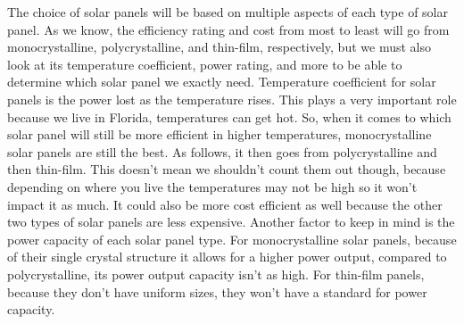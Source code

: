 The choice of solar panels will be based on multiple aspects of each type of solar panel. As we know, the efficiency rating and cost from most to least will go from monocrystalline, polycrystalline, and thin-film, respectively, but we must also look at its temperature coefficient, power rating, and more to be able to determine which solar panel we exactly need. Temperature coefficient for solar panels is the power lost as the temperature rises. This plays a very important role because we live in Florida, temperatures can get hot. So, when it comes to which solar panel will still be more efficient in higher temperatures, monocrystalline solar panels are still the best. As follows, it then goes from polycrystalline and then thin-film. This doesn’t mean we shouldn’t count them out though, because depending on where you live the temperatures may not be high so it won’t impact it as much. It could also be more cost efficient as well because the other two types of solar panels are less expensive. Another factor to keep in mind is the power capacity of each solar panel type. For monocrystalline solar panels, because of their single crystal structure it allows for a higher power output, compared to polycrystalline, its power output capacity isn’t as high. For thin-film panels, because they don’t have uniform sizes, they won’t have a standard for power capacity.


